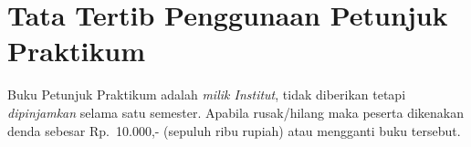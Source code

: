 \documentclass[../main.tex]{subfiles}
\begin{document}
\section*{Tata Tertib Penggunaan Petunjuk Praktikum}
Buku Petunjuk Praktikum adalah \emph{milik Institut}, tidak diberikan tetapi
\emph{dipinjamkan} selama satu semester. Apabila rusak\slash{}hilang maka
peserta dikenakan denda sebesar Rp.\ 10.000,- (sepuluh ribu rupiah) atau
mengganti buku tersebut.
\end{document}
